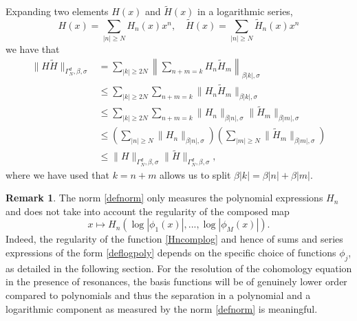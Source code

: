 \documentclass{amsart}
\theoremstyle{plain}
\theoremstyle{definition}
\newtheorem{remark}[theorem]{Remark}
\begin{document}
Expanding two elements $H(x)$ and $\tilde{H}(x)$ in a logarithmic series,
\begin{equation}
    H(x) = \sum_{|n|\geq N} H_{n}(x) x^n,\quad \tilde{H}(x) = \sum_{|n|\geq N} \tilde{H}_{n}(x) x^n
\end{equation}
we have that 
\begin{equation}
\begin{split}
\|H\tilde{H}\|_{\Gamma_N^d,\beta,\sigma} & = \sum_{|k|\geq 2N}\left\|\sum_{n+m=k} H_{n}\tilde{H}_m\right\|_{\beta |k|,\sigma}\\
& \leq \sum_{|k|\geq 2N}\sum_{n+m=k} \|H_{n}\tilde{H}_m\|_{\beta |k|,\sigma} \\
& \leq  \sum_{|k|\geq 2N}\sum_{n+m=k} \|H_n\|_{\beta|n|,\sigma}  \|\tilde{H}_m\|_{\beta|m|,\sigma}  \\
 & \leq  \left(\sum_{|n|\geq N} \|H_n\|_{\beta|n|,\sigma}\right) \left(\sum_{|m|\geq N} \|\tilde{H}_m\|_{\beta|m|,\sigma}\right)\\
& \leq \|H\|_{\Gamma_{N}^d,\beta,\sigma}\|\tilde{H}\|_{\Gamma_{N}^d,\beta,\sigma},
\end{split}
\end{equation}
where we have used that $k=n+m$ allows us to split $\beta|k| = \beta|n|+\beta|m|$.


\begin{remark}
    The norm \eqref{defnorm} only measures the polynomial expressions $H_n$ and does not take into account the regularity of the composed map
\begin{equation}\label{Hncomplog}
        x\mapsto H_n(\log|\phi_1(x)|,...,\log|\phi_M(x)|).
    \end{equation}
Indeed, the regularity of the function \eqref{Hncomplog} and hence of sums and series expressions of the form \eqref{deflogpoly} depends on the specific choice of functions $\phi_j$, as detailed in the following section. For the resolution of the cohomology equation in the presence of resonances, the basis functions will be of genuinely lower order compared to polynomials and thus the separation in a polynomial and a logarithmic component as measured by the norm \eqref{defnorm} is meaningful.  %
\end{remark}
\end{document}
